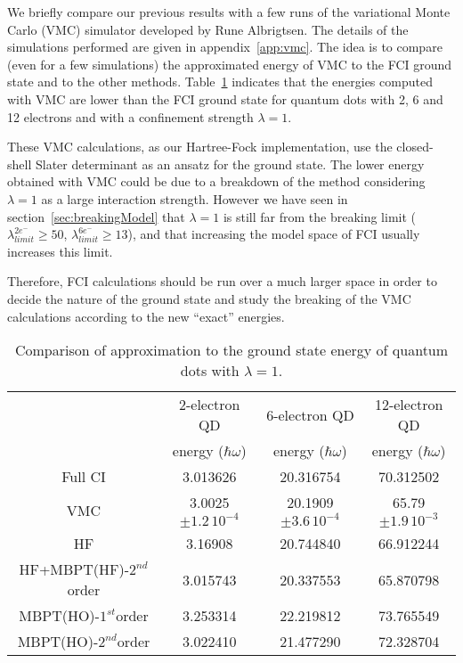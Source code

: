 We briefly compare our previous results with a few runs of the variational Monte Carlo (VMC) simulator developed by Rune Albrigtsen.
The details of the simulations performed are given in appendix~\ref{app:vmc}. The idea is to compare (even for a few simulations) the approximated energy of  VMC to the FCI ground state and to the other methods.  Table~\ref{tab:compVMC} indicates that the energies computed with VMC are  lower than the FCI ground state for quantum dots with 2, 6 and 12 electrons and with a confinement strength $\lambda=1$.

These VMC calculations, as our Hartree-Fock implementation, use the closed-shell Slater determinant as an ansatz for the ground state. The lower energy obtained with VMC could be due to a breakdown of the method considering $\lambda=1$ as a large interaction strength. However we have seen in section~\ref{sec:breakingModel} that $\lambda=1$ is still far from the breaking limit ($\lambda_{limit}^{2e^-} \geq 50$, $\lambda_{limit}^{6e^-} \geq 13$), and that increasing the model space of FCI usually increases this limit.

Therefore, FCI calculations should be run over a much larger space in order to decide the nature of the ground state and study the breaking of the VMC calculations according to the new ``exact'' energies.

\begin{table}[ht]
\centering      %
{\scriptsize
\begin{tabular}[c]{c|c|c|c} 
\toprule[1pt]
\multicolumn{1}{c|}{}    &\multicolumn{1}{c|}{2-electron QD}   &\multicolumn{1}{c|}{6-electron QD} &\multicolumn{1}{c}{12-electron QD} \\
\multicolumn{1}{c|}{}    & \multicolumn{1}{c|}{energy ($\hbar \omega$)}& \multicolumn{1}{c|}{energy ($\hbar \omega$)} & \multicolumn{1}{c|}{energy ($\hbar \omega$)} \\
\hline
Full CI &3.013626  & 20.316754 & 70.312502 \\
VMC & 3.0025 $\pm 1.2 \,10^{-4}$ & 20.1909 $\pm 3.6 \,10^{-4}$ & 65.79$\pm 1.9 \,10^{-3}$  \\
HF & 3.16908  & 20.744840 & 66.912244 \\
HF+MBPT(HF)-$2^{nd}$order & 3.015743 & 20.337553 &65.870798  \\
MBPT(HO)-$1^{st}$order & 3.253314 & 22.219812 &73.765549  \\
MBPT(HO)-$2^{nd}$order &3.022410  & 21.477290 & 72.328704 \\
\toprule[1pt]
\end{tabular}
}
 \caption{Comparison of approximation to the ground state energy of quantum dots with $\lambda=1$.}
\label{tab:compVMC} 
\end{table} 

